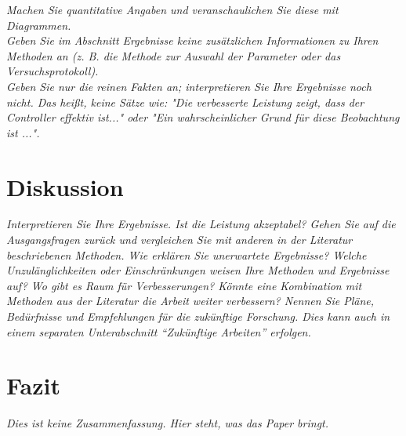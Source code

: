 \documentclass[12pt,a4paper,oneside]{scrartcl}
\begin{document}
\emph{Machen Sie quantitative Angaben und veranschaulichen Sie diese mit Diagrammen. 
\\
Geben Sie im Abschnitt Ergebnisse keine zusätzlichen Informationen zu Ihren Methoden an (z. B. die Methode zur Auswahl der Parameter oder das Versuchsprotokoll). 
\\
Geben Sie nur die reinen Fakten an; interpretieren Sie Ihre Ergebnisse noch nicht. Das heißt, keine Sätze wie: "Die verbesserte Leistung zeigt, dass der Controller effektiv ist..." oder "Ein wahrscheinlicher Grund für diese Beobachtung ist ...".}






\section{Diskussion}
\label{sec:diskussion}
 \emph{Interpretieren Sie Ihre Ergebnisse. Ist die Leistung akzeptabel? Gehen Sie auf die Ausgangsfragen zurück und vergleichen Sie mit anderen in der Literatur beschriebenen Methoden. Wie erklären Sie unerwartete Ergebnisse? Welche Unzulänglichkeiten oder Einschränkungen weisen Ihre Methoden und Ergebnisse auf? Wo gibt es Raum für Verbesserungen? Könnte eine Kombination mit Methoden aus der Literatur die Arbeit weiter verbessern? Nennen Sie Pläne, Bedürfnisse und Empfehlungen für die zukünftige Forschung. Dies kann auch in einem separaten Unterabschnitt ``Zukünftige Arbeiten'' erfolgen.}


\section{Fazit}
\label{sec:fazit}
\emph{Dies ist keine Zusammenfassung. Hier steht, was das Paper bringt.}


%
\newpage



%



\newpage
\appendix



\end{document}
